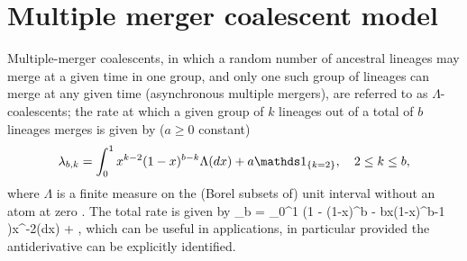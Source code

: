 \documentclass{article}
\begin{document}
\label{app-multiple-mergers}
\section{Multiple merger coalescent model}

Multiple-merger coalescents, in which a random number of ancestral
lineages may merge at a given time in one group, and only one such
group of lineages can merge at any given time (asynchronous multiple
mergers), are referred to as $\Lambda$-coalescents; the rate at which  a given group of $k$ lineages out of a total of  $b$ lineages merges  is given by ($a\ge  0$ constant)
\begin{equation}\label{lambdabk}
\lambda_{b, k} =  \int_0^1  x^{k-2}(1-x)^{b-k}\Lambda(dx) + a\one{k=2}, \quad 2 \le k \le b,
\end{equation}
where $\Lambda$ is a finite measure on the  (Borel subsets of)  unit interval without an atom at zero \citep{DK99,P99,S99}.    The  total rate  is given by
\be\label{lambdab}
 \lambda_{b} = \int_0^1 \left(1 - (1-x)^{b} - bx(1-x)^{b-1} \right)x^{-2}\Lambda(dx) + ,
\ee
\citep{S99}  which can be useful in applications, in particular  provided the  antiderivative  can be explicitly identified.
\end{document}
